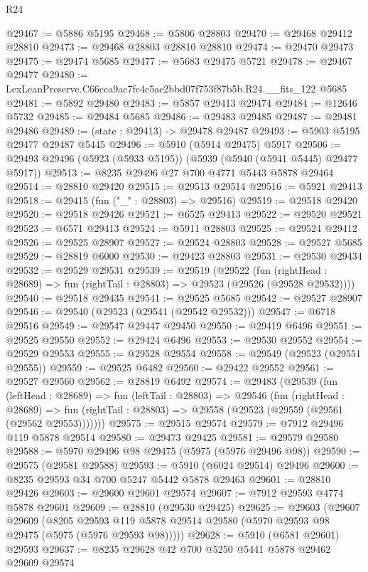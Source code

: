 \begin{lexlean}{R24}
\begin{coremodule}
@29467 := @5886 @5195
@29468 := @5806 @28803
@29470 := @29468 @29412 @28810
@29473 := @29468 @28803 @28810 @28810
@29474 := @29470 @29473
@29475 := @29474 @5685
@29477 := @5683 @29475 @5721
@29478 := @29467 @29477
@29480 := LexLeanPreserve.C66cca9ac7fc4c5ae2bbd07f753f87b5b.R24.__fits_122 @5685
@29481 := @5892 @29480
@29483 := @5857 @29413 @29474
@29484 := @12646 @5732
@29485 := @29484 @5685
@29486 := @29483 @29485
@29487 := @29481 @29486
@29489 := (state : @29413) -> @29478 @29487
@29493 := @5903 @5195 @29477 @29487 @5445
@29496 := @5910 (@5914 @29475) @5917
@29506 := @29493 @29496 (@5923 (@5933 @5195)) (@5939 (@5940 (@5941 @5445) @29477 @5917))
@29513 := @8235 @29496 @27 @700 @4771 @5443 @5878 @29464
@29514 := @28810 @29420
@29515 := @29513 @29514
@29516 := @5921 @29413
@29518 := @29415 (fun ("_" : @28803) => @29516)
@29519 := @29518 @29420
@29520 := @29518 @29426
@29521 := @6525 @29413
@29522 := @29520 @29521
@29523 := @6571 @29413
@29524 := @5911 @28803
@29525 := @29524 @29412
@29526 := @29525 @28907
@29527 := @29524 @28803
@29528 := @29527 @5685
@29529 := @28819 @6000
@29530 := @29423 @28803
@29531 := @29530 @29434
@29532 := @29529 @29531
@29539 := @29519
    (@29522
      (fun (rightHead : @28689) => fun (rightTail : @28803) => @29523 (@29526 (@29528 @29532))))
@29540 := @29518 @29435
@29541 := @29525 @5685
@29542 := @29527 @28907
@29546 := @29540 (@29523 (@29541 (@29542 @29532)))
@29547 := @6718 @29516
@29549 := @29547 @29447 @29450
@29550 := @29419 @6496
@29551 := @29525 @29550
@29552 := @29424 @6496
@29553 := @29530 @29552
@29554 := @29529 @29553
@29555 := @29528 @29554
@29558 := @29549 (@29523 (@29551 @29555))
@29559 := @29525 @6482
@29560 := @29422 @29552
@29561 := @29527 @29560
@29562 := @28819 @6492
@29574 := @29483
    (@29539
      (fun (leftHead : @28689) =>
      fun (leftTail : @28803) =>
      @29546
        (fun (rightHead : @28689) =>
        fun (rightTail : @28803) => @29558 (@29523 (@29559 (@29561 (@29562 @29553)))))))
@29575 := @29515 @29574
@29579 := @7912 @29496 @119 @5878 @29514
@29580 := @29473 @29425
@29581 := @29579 @29580
@29588 := @5970 @29496 @98 @29475 (@5975 (@5976 @29496 @98))
@29590 := @29575 (@29581 @29588)
@29593 := @5910 (@6024 @29514) @29496
@29600 := @8235 @29593 @34 @700 @5247 @5442 @5878 @29463
@29601 := @28810 @29426
@29603 := @29600 @29601 @29574
@29607 := @7912 @29593 @4774 @5878 @29601
@29609 := @28810 (@29530 @29425)
@29625 := @29603
    (@29607
      @29609
      (@8205 @29593 @119 @5878 @29514 @29580 (@5970 @29593 @98 @29475 (@5975 (@5976 @29593 @98)))))
@29628 := @5910 (@6581 @29601) @29593
@29637 := @8235 @29628 @42 @700 @5250 @5441 @5878 @29462 @29609 @29574

\end{coremodule}
\end{lexlean}
